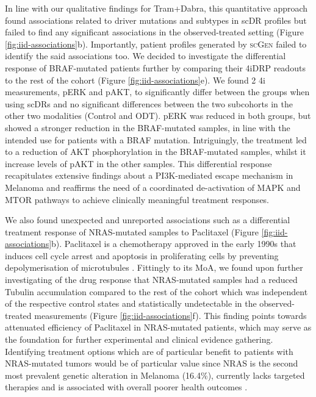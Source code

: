 In line with our qualitative findings for Tram+Dabra, this quantitative approach found associations related to driver mutations and subtypes in scDR profiles but failed to find any significant associations in the observed-treated setting (Figure \ref{fig:iid-associations}b).
 Importantly, patient profiles generated by \textsc{scGen} failed to identify the said associations too.
 We decided to investigate the differential response of BRAF-mutated patients further by comparing their 4iDRP readouts to the rest of the cohort (Figure \ref{fig:iid-associations}e).
 We found 2 4i measurements, pERK and pAKT, to significantly differ between the groups when using scDRs and no significant differences between the two subcohorts in the other two modalities (Control and ODT).
 pERK was reduced in both groups, but showed a stronger reduction in the BRAF-mutated samples, in line with the intended use for patients with a BRAF mutation.
 Intriguingly, the treatment led to a reduction of AKT phosphorylation in the BRAF-mutated samples, whilst it increase levels of pAKT in the other samples.
 This differential response recapitulates extensive findings about a PI3K-mediated escape mechanism in Melanoma \cite{penna2015,irvine2018} and reaffirms the need of a coordinated de-activation of MAPK and MTOR pathways to achieve clinically meaningful treatment responses. 

We also found unexpected and unreported associations such as a differential treatment response of NRAS-mutated samples to Paclitaxel (Figure \ref{fig:iid-associations}b).
 Paclitaxel is a chemotherapy approved in the early 1990s that induces cell cycle arrest and apoptosis in proliferating cells by preventing depolymerisation of microtubules \cite{panchagnula1998}.
 Fittingly to its MoA, we found upon further investigating of the drug response that NRAS-mutated samples had a reduced Tubulin accumulation compared to the rest of the cohort which was independent of the respective control states and statistically undetectable in the observed-treated measurements (Figure \ref{fig:iid-associations}f).
 This finding points towards attenuated efficiency of Paclitaxel in NRAS-mutated patients, which may serve as the foundation for further experimental and clinical evidence gathering.
 Identifying treatment options which are of particular benefit to patients with NRAS-mutated tumors would be of particular value since NRAS is the second most prevalent genetic alteration in Melanoma (16.4\%), currently lacks targeted therapies and is associated with overall poorer health outcomes \cite{gutierrez-castaneda2020}. 

